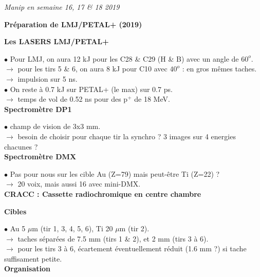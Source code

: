 \documentclass{report}
\begin{document}
{\it
\noindent
Manip en semaine 16, 17 \& 18 2019}

\bigskip

\begin{center}
{\large
\bf
Pr\'eparation de LMJ/PETAL+ (2019)\\[0.2cm]
}
{\it }
\end{center}

\bigskip

\noindent
{\bf Les LASERS LMJ/PETAL+}

\noindent $\bullet$ Pour LMJ, on aura 12 kJ pour les C28 \& C29 (H \& B) avec un angle de $60^o$.\\
\noindent $\rightarrow$ pour les tirs 5 \& 6, on aura 8 kJ pour C10 avec $40^o$ : en gros m\^emes taches.\\
\noindent $\rightarrow$ impulsion sur 5 ns.\\
\noindent $\bullet$ On reste \`a 0.7 kJ sur PETAL+ (le max) sur 0.7 ps.\\
\noindent $\rightarrow$ temps de vol de 0.52 ns pour des p$^+$ de 18 MeV.\\

\noindent
{\bf Spectromètre DP1}

\noindent $\bullet$ champ de vision de 3x3 mm.\\
\noindent $\rightarrow$ besoin de choisir pour chaque tir la synchro ? 3 images sur 4 energies chacunes ?\\


\noindent
{\bf Spectromètre DMX}

\noindent $\bullet$ Pas pour nous sur les cible Au (Z=79) mais peut-\^etre Ti (Z=22) ?\\
\noindent $\rightarrow$ 20 voix, mais aussi 16 avec mini-DMX.\\


\noindent
{\bf CRACC : Cassette radiochromique en centre chambre}

\bigskip


\noindent
{\bf Cibles}

\noindent $\bullet$ Au 5 $\mu$m (tir 1, 3, 4, 5, 6), Ti 20 $\mu$m (tir 2).\\
\noindent $\rightarrow$ taches s\'epar\'ees de 7.5 mm (tirs 1 \& 2), et 2 mm (tirs 3 \`a 6).\\
\noindent $\rightarrow$ pour les tirs 3 \`a 6, \'ecartement \'eventuellement r\'eduit (1.6 mm ?) si tache suffisament petite.\\


\noindent
{\bf Organisation}
\end{document}
